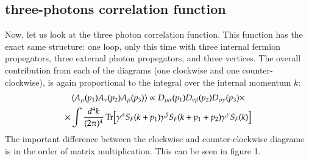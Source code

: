 \documentclass{article}
\begin{document}
\subsection{three-photons correlation function}
Now, let us look at the three photon correlation function. This function has the exact same structure: one loop, only this time with three internal fermion propegators, three external photon propegators, and three vertices. The overall contribution from each of the diagrams (one clockwise and one counter-clockwise), is again proportional to the integral over the internal momentum $k$:
\begin{equation}
\begin{gathered}
    \langle A_\mu(p_1) A_\nu(p_2) A_\rho(p_3) \rangle \propto
    D_{\mu\alpha}(p_1)
    D_{\nu\beta}(p_2)
    D_{\rho\gamma}(p_3)
    \times \\ \times
    \int \frac{d^4k}{(2\pi)^4}
    \Tr[
        \gamma^\alpha S_F(k + p_1)
        \gamma^\beta S_F(k + p_1 + p_2)
        \gamma^\gamma S_F(k)
    ]
\end{gathered}
\end{equation}
The important difference between the clockwise and counter-clockwise diagrams is in the order of matrix multiplication. This can be seen in figure 1.
\end{document}

